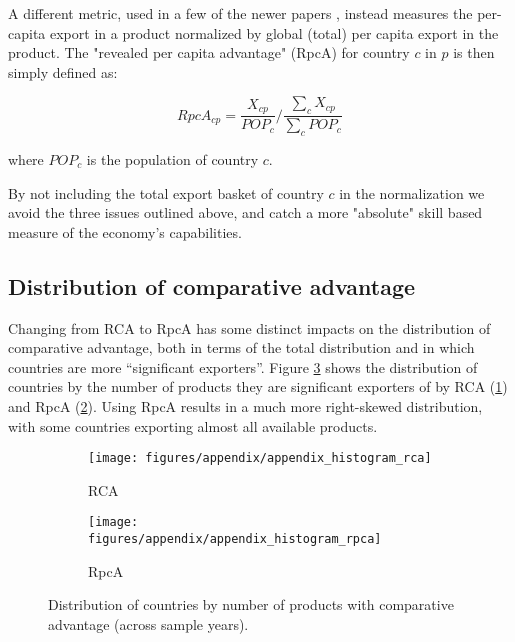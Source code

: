 \documentclass[11pt]{article}
\begin{document}
\begin{appendices}
A different metric, used in a few of the newer papers \citep{hausmann_implied_2019}, instead measures the per-capita export in a product normalized by global (total) per capita export in the product. The "revealed per capita advantage" (RpcA) for country $c$ in $p$ is then simply defined as:

\[
	RpcA_{cp} = \frac{X_{cp}}{POP_{c}} \bigg / \frac{\sum_c X_{cp}}{\sum_c POP_c}
\]

where $POP_c$ is the population of country $c$.

By not including the total export basket of country $c$ in the normalization we avoid the three issues outlined above, and catch a more "absolute" skill based measure of the economy's capabilities. 

\subsection{Distribution of comparative advantage}
\label{subsec:dist}

Changing from RCA to RpcA has some distinct impacts on the distribution of comparative advantage, both in terms of the total distribution and in which countries are more ``significant exporters''. Figure \ref{fig:rca_rpca_hist} shows the distribution of countries by the number of products they are significant exporters of by RCA (\ref{fig:rca_hist}) and RpcA (\ref{fig:rpca_hist}). Using RpcA results in a much more right-skewed distribution, with some countries exporting almost all available products.

\begin{figure}
     \centering
     \begin{subfigure}[b]{0.45\textwidth}
         \centering
         \texttt{[image: figures/appendix/appendix\_histogram\_rca]}
         \caption{RCA}
         \label{fig:rca_hist}
     \end{subfigure}
     \hfill
     \begin{subfigure}[b]{0.45\textwidth}
         \centering
         \texttt{[image: figures/appendix/appendix\_histogram\_rpca]}
         \caption{RpcA}
         \label{fig:rpca_hist}
     \end{subfigure}
        \caption{Distribution of countries by number of products with
		  comparative advantage (across sample years).}
        \label{fig:rca_rpca_hist}
\end{figure}


\end{appendices}
\end{document}
